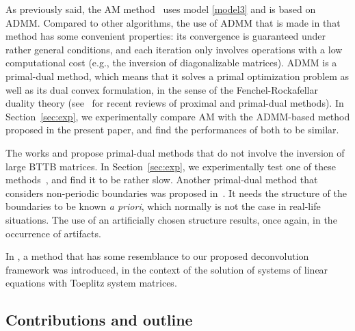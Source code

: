 \documentclass[10pt,twocolumn,twoside]{IEEEtran}
\begin{document}
As previously said, the AM method~\cite{Almeida2013a,Matakos2013} uses model \eqref{model3} and is based on ADMM. Compared to other algorithms, the use of ADMM that is made in that method has some convenient properties: its convergence is guaranteed under rather general conditions, and each iteration only involves operations with a low computational cost (e.g., the inversion of diagonalizable matrices). ADMM is a primal-dual method, which means that it solves a primal optimization problem as well as its dual convex formulation, in the sense of the Fenchel-Rockafellar duality theory (see~\cite{Combettes2009, Parikh2013, Komodakis2014} for recent reviews of proximal and primal-dual methods). In Section~\ref{sec:exp}, we experimentally compare AM with the ADMM-based method proposed in the present paper, and find the performances of both to be similar.

The works \cite{Condat2013} and \cite{Combettes2014} propose primal-dual methods that do not involve the inversion of large BTTB matrices. In Section~\ref{sec:exp}, we experimentally test one of these methods~\cite{Condat2013}, and find it to be rather slow. Another primal-dual method that considers non-periodic boundaries was proposed in~\cite{OConnor2014}. It needs the structure of the boundaries to be known \textit{a priori}, which normally is not the case in real-life situations. The use of an artificially chosen structure results, once again, in the occurrence of artifacts.

In \cite{Ferreira2010}, a method that has some resemblance to our proposed deconvolution framework was introduced, in the context of the solution of systems of linear equations with Toeplitz system matrices.



\subsection{Contributions and outline}
\end{document}
